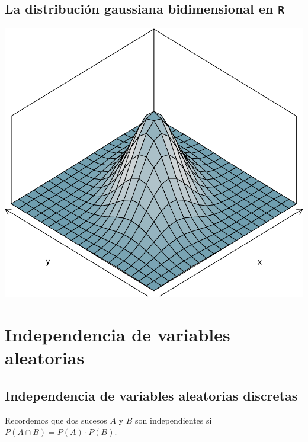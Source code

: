 \documentclass[]{book}
\begin{document}
\hypertarget{la-distribuciuxf3n-gaussiana-bidimensional-en-r-1}{%
\subsection{\texorpdfstring{La distribución gaussiana bidimensional en \texttt{R}}{La distribución gaussiana bidimensional en R}}\label{la-distribuciuxf3n-gaussiana-bidimensional-en-r-1}}

\begin{center}\includegraphics{curso-probabilidad-udemy_files/figure-latex/unnamed-chunk-139-1} \end{center}

\hypertarget{independencia-de-variables-aleatorias}{%
\section{Independencia de variables aleatorias}\label{independencia-de-variables-aleatorias}}

\hypertarget{independencia-de-variables-aleatorias-discretas}{%
\subsection{Independencia de variables aleatorias discretas}\label{independencia-de-variables-aleatorias-discretas}}

Recordemos que dos sucesos \(A\) y \(B\) son independientes si \(P(A\cap B)=P(A)\cdot P(B)\).
\end{document}
